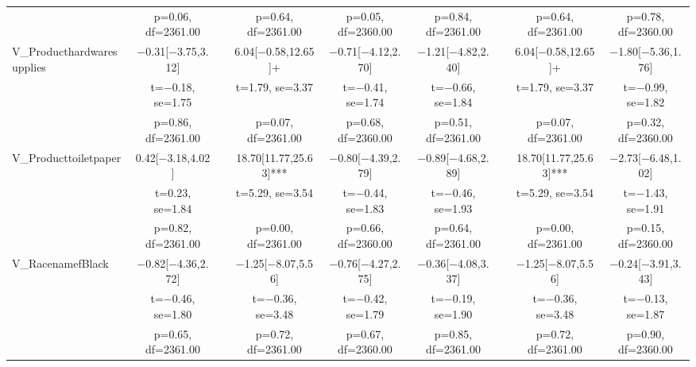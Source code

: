 \documentclass[]{report}
\begin{document}
\begin{table}
{\begin{tabular}[t]{lcccccccc}
		& p=\num{0.06}, df=\num{2361.00} &  & p=\num{0.64}, df=\num{2361.00} & p=\num{0.05}, df=\num{2360.00} & p=\num{0.84}, df=\num{2361.00} &  & p=\num{0.64}, df=\num{2361.00} & p=\num{0.78}, df=\num{2360.00}\\
		V\_Producthardwaresupplies & \num{-0.31}[\num{-3.75},\num{3.12}] &  & \num{6.04}[\num{-0.58},\num{12.65}]+ & \num{-0.71}[\num{-4.12},\num{2.70}] & \num{-1.21}[\num{-4.82},\num{2.40}] &  & \num{6.04}[\num{-0.58},\num{12.65}]+ & \num{-1.80}[\num{-5.36},\num{1.76}]\\
		& t=\num{-0.18}, se=\num{1.75} &  & t=\num{1.79}, se=\num{3.37} & t=\num{-0.41}, se=\num{1.74} & t=\num{-0.66}, se=\num{1.84} &  & t=\num{1.79}, se=\num{3.37} & t=\num{-0.99}, se=\num{1.82}\\
		& p=\num{0.86}, df=\num{2361.00} &  & p=\num{0.07}, df=\num{2361.00} & p=\num{0.68}, df=\num{2360.00} & p=\num{0.51}, df=\num{2361.00} &  & p=\num{0.07}, df=\num{2361.00} & p=\num{0.32}, df=\num{2360.00}\\
		V\_Producttoiletpaper & \num{0.42}[\num{-3.18},\num{4.02}] &  & \num{18.70}[\num{11.77},\num{25.63}]*** & \num{-0.80}[\num{-4.39},\num{2.79}] & \num{-0.89}[\num{-4.68},\num{2.89}] &  & \num{18.70}[\num{11.77},\num{25.63}]*** & \num{-2.73}[\num{-6.48},\num{1.02}]\\
		& t=\num{0.23}, se=\num{1.84} &  & t=\num{5.29}, se=\num{3.54} & t=\num{-0.44}, se=\num{1.83} & t=\num{-0.46}, se=\num{1.93} &  & t=\num{5.29}, se=\num{3.54} & t=\num{-1.43}, se=\num{1.91}\\
		& p=\num{0.82}, df=\num{2361.00} &  & p=\num{0.00}, df=\num{2361.00} & p=\num{0.66}, df=\num{2360.00} & p=\num{0.64}, df=\num{2361.00} &  & p=\num{0.00}, df=\num{2361.00} & p=\num{0.15}, df=\num{2360.00}\\
		V\_RacenamefBlack & \num{-0.82}[\num{-4.36},\num{2.72}] &  & \num{-1.25}[\num{-8.07},\num{5.56}] & \num{-0.76}[\num{-4.27},\num{2.75}] & \num{-0.36}[\num{-4.08},\num{3.37}] &  & \num{-1.25}[\num{-8.07},\num{5.56}] & \num{-0.24}[\num{-3.91},\num{3.43}]\\
		& t=\num{-0.46}, se=\num{1.80} &  & t=\num{-0.36}, se=\num{3.48} & t=\num{-0.42}, se=\num{1.79} & t=\num{-0.19}, se=\num{1.90} &  & t=\num{-0.36}, se=\num{3.48} & t=\num{-0.13}, se=\num{1.87}\\
		& p=\num{0.65}, df=\num{2361.00} &  & p=\num{0.72}, df=\num{2361.00} & p=\num{0.67}, df=\num{2360.00} & p=\num{0.85}, df=\num{2361.00} &  & p=\num{0.72}, df=\num{2361.00} & p=\num{0.90}, df=\num{2360.00}\\

\end{tabular}}
\end{table}
\end{document}
